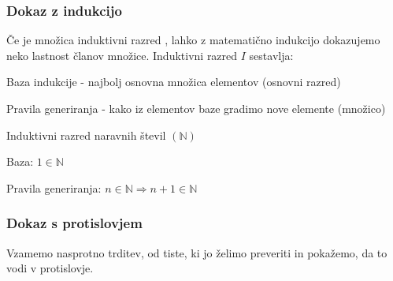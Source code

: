 \documentclass[10pt,a4paper,oneside]{book}
\begin{document}
\subsubsection{Dokaz z indukcijo}
Če je množica induktivni razred%
, lahko z matematično indukcijo dokazujemo neko lastnost članov množice. Induktivni razred $I$ sestavlja:
\begin{items}
\item Baza indukcije - najbolj osnovna množica elementov (osnovni razred)
\item Pravila generiranja - kako iz elementov baze gradimo nove elemente (množico)
\end{items}
\begin{primeri}
\item Induktivni razred naravnih števil $(\mathbb{N})$
	\begin{items}
	\item Baza: $1 \in \mathbb{N}$ 
	\item Pravila generiranja: $n \in \mathbb{N} \Longrightarrow n+1 \in \mathbb{N} $
	\end{items}
\item {}
\end{primeri}

\subsubsection{Dokaz s protislovjem}
Vzamemo nasprotno trditev, od tiste, ki jo želimo preveriti in pokažemo, da to vodi v protislovje.
\end{document}
